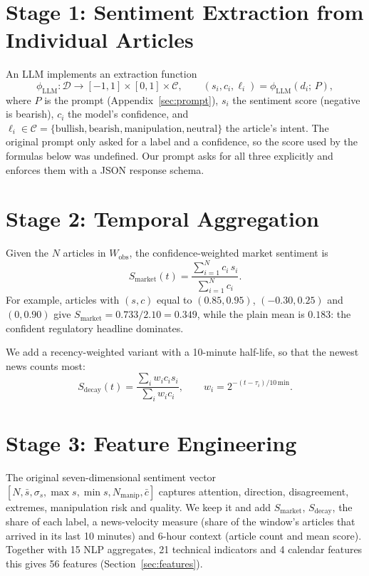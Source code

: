 \documentclass[12pt,a4paper,oneside]{report}
\newcommand{\Wobs}{W_{\mathrm{obs}}}
\begin{document}
\section{Stage 1: Sentiment Extraction from Individual Articles}
An LLM implements an extraction function
\begin{equation}
  \phi_{\mathrm{LLM}} : \mathcal{D} \to [-1,1] \times [0,1] \times \mathcal{C},
  \qquad (s_i, c_i, \ell_i) = \phi_{\mathrm{LLM}}(d_i;\, P),
\end{equation}
where $P$ is the prompt (Appendix~\ref{sec:prompt}), $s_i$ the sentiment
score (negative is bearish), $c_i$ the model's confidence, and
$\ell_i \in \mathcal{C} = \{\text{bullish}, \text{bearish},
\text{manipulation}, \text{neutral}\}$ the article's intent. The original
prompt only asked for a label and a confidence, so the score used by the
formulas below was undefined. Our prompt asks for all three explicitly and
enforces them with a JSON response schema.

\section{Stage 2: Temporal Aggregation}
Given the $N$ articles in $\Wobs$, the confidence-weighted market sentiment is
\begin{equation}
  S_{\mathrm{market}}(t) = \frac{\sum_{i=1}^{N} c_i\, s_i}{\sum_{i=1}^{N} c_i}.
\end{equation}
For example, articles with $(s,c)$ equal to $(0.85, 0.95)$, $(-0.30, 0.25)$
and $(0, 0.90)$ give $S_{\mathrm{market}} = 0.733/2.10 = 0.349$, while the
plain mean is $0.183$: the confident regulatory headline dominates.

We add a recency-weighted variant with a 10-minute half-life, so that the
newest news counts most:
\begin{equation}
  S_{\mathrm{decay}}(t) = \frac{\sum_i w_i c_i s_i}{\sum_i w_i c_i},
  \qquad w_i = 2^{-(t-\tau_i)/10\,\mathrm{min}}.
\end{equation}

\section{Stage 3: Feature Engineering}
The original seven-dimensional sentiment vector
$[N, \bar{s}, \sigma_s, \max s, \min s, N_{\mathrm{manip}}, \bar{c}]$ captures
attention, direction, disagreement, extremes, manipulation risk and quality.
We keep it and add $S_{\mathrm{market}}$, $S_{\mathrm{decay}}$, the share of
each label, a news-velocity measure (share of the window's articles that
arrived in its last 10 minutes) and 6-hour context (article count and mean
score). Together with 15 NLP aggregates, 21 technical indicators and 4
calendar features this gives 56 features (Section~\ref{sec:features}).
\end{document}
